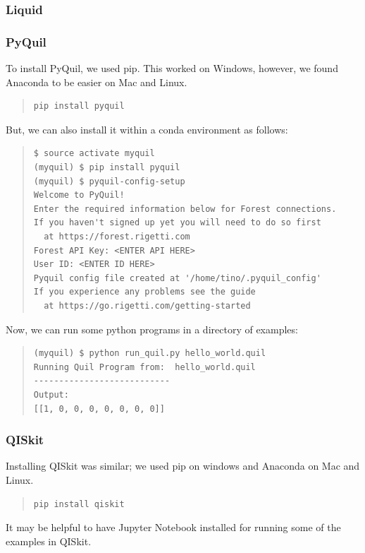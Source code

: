 \documentclass[a4paper,10pt]{article}
\begin{document}
\subsubsection{Liquid}


\subsubsection{PyQuil}
To install PyQuil, we used pip. This worked on Windows, however, we found Anaconda to be easier on Mac and Linux.

\begin{quote}
\begin{verbatim}
pip install pyquil
\end{verbatim}
\end{quote}

But, we can also install it within a conda environment as follows:
\begin{quote}
\begin{verbatim} 
$ source activate myquil
(myquil) $ pip install pyquil
(myquil) $ pyquil-config-setup
Welcome to PyQuil!
Enter the required information below for Forest connections.
If you haven't signed up yet you will need to do so first 
  at https://forest.rigetti.com
Forest API Key: <ENTER API HERE>
User ID: <ENTER ID HERE>
Pyquil config file created at '/home/tino/.pyquil_config'
If you experience any problems see the guide 
  at https://go.rigetti.com/getting-started
\end{verbatim}
\end{quote}
Now, we can run some python programs in a directory of examples:
\begin{quote}
\begin{verbatim} 
(myquil) $ python run_quil.py hello_world.quil 
Running Quil Program from:  hello_world.quil
---------------------------
Output: 
[[1, 0, 0, 0, 0, 0, 0, 0]]
\end{verbatim}
\end{quote}

\subsubsection{QISkit}

Installing QISkit was similar; we used pip on windows and Anaconda on Mac and Linux.

\begin{quote}
\begin{verbatim}
pip install qiskit
\end{verbatim}
\end{quote}
It may be helpful to have Jupyter Notebook installed for running some of the examples in QISkit.
\end{document}
